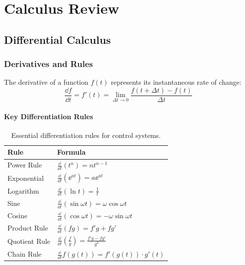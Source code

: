 \chapter{Calculus Review}
\label{ch:calculus}

\section{Differential Calculus}

\subsection{Derivatives and Rules}

The derivative of a function $f(t)$ represents its instantaneous rate of change:
\begin{equation}
\frac{\dd f}{\dd t} = f'(t) = \lim_{\Delta t \to 0} \frac{f(t + \Delta t) - f(t)}{\Delta t}
\end{equation}



\subsubsection{Key Differentiation Rules}

\begin{table}[htbp]
\centering
\begin{tabular}{ll}
\toprule
\textbf{Rule} & \textbf{Formula} \\
\midrule
Power Rule & $\frac{\dd}{\dd t}(t^n) = n t^{n-1}$ \\
Exponential & $\frac{\dd}{\dd t}(\ee^{at}) = a\ee^{at}$ \\
Logarithm & $\frac{\dd}{\dd t}(\ln t) = \frac{1}{t}$ \\
Sine & $\frac{\dd}{\dd t}(\sin\omega t) = \omega\cos\omega t$ \\
Cosine & $\frac{\dd}{\dd t}(\cos\omega t) = -\omega\sin\omega t$ \\
Product Rule & $\frac{\dd}{\dd t}(fg) = f'g + fg'$ \\
Quotient Rule & $\frac{\dd}{\dd t}\left(\frac{f}{g}\right) = \frac{f'g - fg'}{g^2}$ \\
Chain Rule & $\frac{\dd}{\dd t}f(g(t)) = f'(g(t)) \cdot g'(t)$ \\
\bottomrule
\end{tabular}
\caption{Essential differentiation rules for control systems.}
\label{tab:diff_rules}
\end{table}

